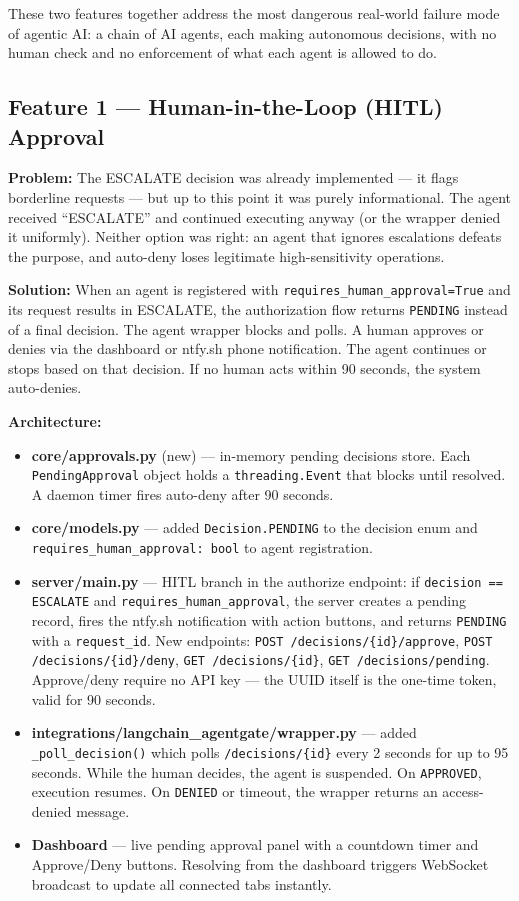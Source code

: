 \documentclass[12pt, a4paper]{article}
\begin{document}
These two features together address the most dangerous real-world failure mode
of agentic AI: a chain of AI agents, each making autonomous decisions, with
no human check and no enforcement of what each agent is allowed to do.

\subsection{Feature 1 — Human-in-the-Loop (HITL) Approval}

\textbf{Problem:} The ESCALATE decision was already implemented — it flags
borderline requests — but up to this point it was purely informational.
The agent received ``ESCALATE'' and continued executing anyway (or the wrapper
denied it uniformly). Neither option was right: an agent that ignores escalations
defeats the purpose, and auto-deny loses legitimate high-sensitivity operations.

\textbf{Solution:} When an agent is registered with
\texttt{requires\_human\_approval=True} and its request results in ESCALATE,
the authorization flow returns \texttt{PENDING} instead of a final decision.
The agent wrapper blocks and polls. A human approves or denies via the
dashboard or ntfy.sh phone notification. The agent continues or stops based
on that decision. If no human acts within 90 seconds, the system auto-denies.

\textbf{Architecture:}

\begin{itemize}[noitemsep]
  \item \textbf{core/approvals.py} (new) — in-memory pending decisions store.
    Each \texttt{PendingApproval} object holds a \texttt{threading.Event}
    that blocks until resolved. A daemon timer fires auto-deny after 90 seconds.
  \item \textbf{core/models.py} — added \texttt{Decision.PENDING} to the
    decision enum and \texttt{requires\_human\_approval: bool} to agent registration.
  \item \textbf{server/main.py} — HITL branch in the authorize endpoint:
    if \texttt{decision == ESCALATE} and \texttt{requires\_human\_approval}, the
    server creates a pending record, fires the ntfy.sh notification with
    action buttons, and returns \texttt{PENDING} with a \texttt{request\_id}.
    New endpoints: \texttt{POST /decisions/\{id\}/approve},
    \texttt{POST /decisions/\{id\}/deny}, \texttt{GET /decisions/\{id\}},
    \texttt{GET /decisions/pending}. Approve/deny require no API key —
    the UUID itself is the one-time token, valid for 90 seconds.
  \item \textbf{integrations/langchain\_agentgate/wrapper.py} — added
    \texttt{\_poll\_decision()} which polls \texttt{/decisions/\{id\}} every
    2 seconds for up to 95 seconds. While the human decides, the agent is
    suspended. On \texttt{APPROVED}, execution resumes. On \texttt{DENIED}
    or timeout, the wrapper returns an access-denied message.
  \item \textbf{Dashboard} — live pending approval panel with a countdown
    timer and Approve/Deny buttons. Resolving from the dashboard triggers
    WebSocket broadcast to update all connected tabs instantly.
\end{itemize}
\end{document}

